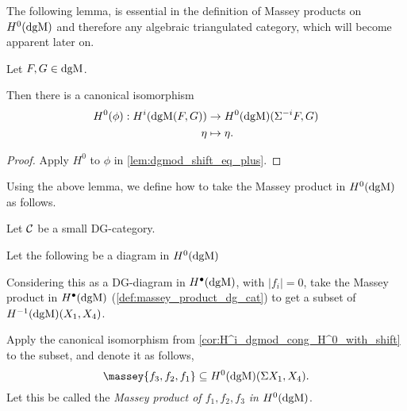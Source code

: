 The following lemma, is essential in the definition of Massey products on \( H^0(\operatorname{dgM}) \) and therefore any algebraic triangulated category, which will become apparent later on.

\begin{lemma}
    \label{cor:H^i_dgmod_cong_H^0_with_shift}
    Let \( F, G \in \operatorname{dgM} \).

    Then there is a canonical isomorphism
    \begin{align*}
        H^0(\phi): H^i(\operatorname{dgM}(F, G)) &\to H^0(\operatorname{dgM})(\Sigma^{-i} F, G) \\
        \eta &\mapsto \eta.
    \end{align*}
\end{lemma}
\begin{proof}
    Apply \( H^0 \) to \( \phi \) in \autoref{lem:dgmod_shift_eq_plus}.
\end{proof}

Using the above lemma, we define how to take the Massey product in \( H^0(\operatorname{dgM}) \) as follows.

\begin{definition}
    \label{def:massey_product_H^0(dgMod_dg(C))}
    Let \( {\mathcal{C}} \) be a small DG-category.
    
    Let the following be a diagram in \( H^0(\operatorname{dgM}) \)
    \begin{center}
    \end{center}
    Considering this as a DG-diagram in \( H^{\bullet}(\operatorname{dgM}) \), with \( |f_i| = 0 \), take the Massey product in \( H^{\bullet}(\operatorname{dgM}) \) (\autoref{def:massey_product_dg_cat}) to get a subset of \( H^{-1}(\operatorname{dgM})(X_1, X_4) \).
    
    Apply the canonical isomorphism from \autoref{cor:H^i_dgmod_cong_H^0_with_shift} to the subset, and denote it as follows,
    \[
        \massey{f_3, f_2, f_1} \subseteq H^0(\dgM)(\Sigma X_1, X_4).
    \]
    Let this be called the \emph{Massey product of \( f_1, f_2, f_3 \) in \( H^0(\operatorname{dgM}) \)}.
\end{definition}

